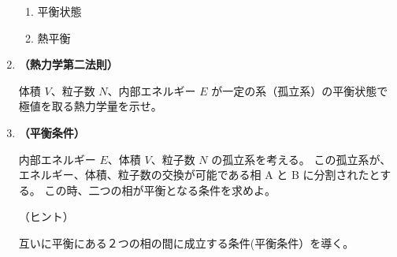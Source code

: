 \documentclass[uplatex,dvipdfmx,a4paper,11pt]{jsarticle}
\newcommand{\diff}{\mathrm d}
\begin{document}
\begin{enumerate}
\begin{enumerate}
\item
平衡状態

%
\item
熱平衡


\end{enumerate}


\item
{\bf （熱力学第二法則）}

体積 $V$、粒子数 $N$、内部エネルギー $E$ が一定の系（孤立系）の平衡状態で極値を取る熱力学量を示せ。

%
%
%
%
%


\item
{\bf （平衡条件）}

内部エネルギー $E$、体積 $V$、粒子数 $N$ の孤立系を考える。
この孤立系が、エネルギー、体積、粒子数の交換が可能である相 A と B に分割されたとする。
この時、二つの相が平衡となる条件を求めよ。

（ヒント）

互いに平衡にある２つの相の間に成立する条件(平衡条件）を導く。


\end{enumerate}
\end{document}
